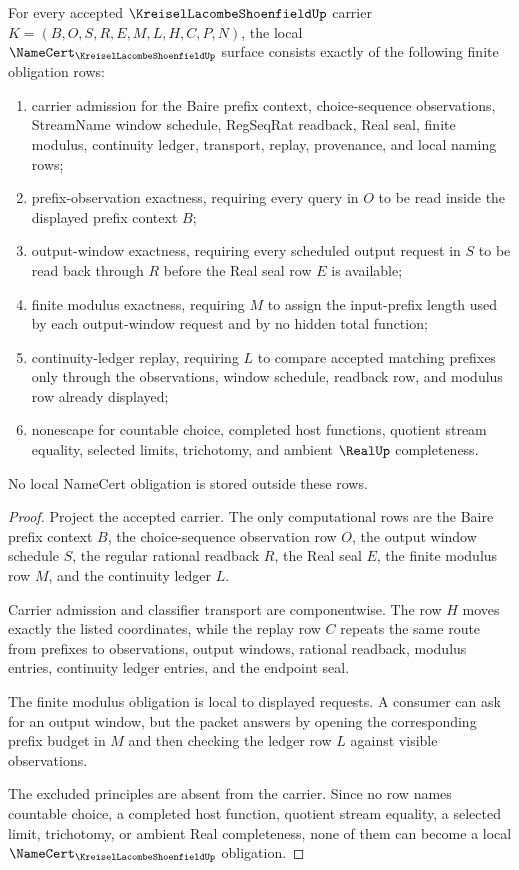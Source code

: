 \begin{theorem}\label{thm:kreisel-lacombe-shoenfield-namecert-obligations}
For every accepted $\KreiselLacombeShoenfieldUp$ carrier $K=(B,O,S,R,E,M,L,H,C,P,N)$, the local $\NameCert_{\KreiselLacombeShoenfieldUp}$ surface consists exactly of the following finite obligation rows:
\begin{enumerate}
\item carrier admission for the Baire prefix context, choice-sequence observations, StreamName window schedule, RegSeqRat readback, Real seal, finite modulus, continuity ledger, transport, replay, provenance, and local naming rows;
\item prefix-observation exactness, requiring every query in $O$ to be read inside the displayed prefix context $B$;
\item output-window exactness, requiring every scheduled output request in $S$ to be read back through $R$ before the Real seal row $E$ is available;
\item finite modulus exactness, requiring $M$ to assign the input-prefix length used by each output-window request and by no hidden total function;
\item continuity-ledger replay, requiring $L$ to compare accepted matching prefixes only through the observations, window schedule, readback row, and modulus row already displayed;
\item nonescape for countable choice, completed host functions, quotient stream equality, selected limits, trichotomy, and ambient $\RealUp$ completeness.
\end{enumerate}
No local NameCert obligation is stored outside these rows.
\end{theorem}
\begin{proof}
Project the accepted carrier. The only computational rows are the Baire prefix context $B$, the choice-sequence observation row $O$, the output window schedule $S$, the regular rational readback $R$, the Real seal $E$, the finite modulus row $M$, and the continuity ledger $L$.

Carrier admission and classifier transport are componentwise. The row $H$ moves exactly the listed coordinates, while the replay row $C$ repeats the same route from prefixes to observations, output windows, rational readback, modulus entries, continuity ledger entries, and the endpoint seal.

The finite modulus obligation is local to displayed requests. A consumer can ask for an output window, but the packet answers by opening the corresponding prefix budget in $M$ and then checking the ledger row $L$ against visible observations.

The excluded principles are absent from the carrier. Since no row names countable choice, a completed host function, quotient stream equality, a selected limit, trichotomy, or ambient Real completeness, none of them can become a local $\NameCert_{\KreiselLacombeShoenfieldUp}$ obligation.
\end{proof}

